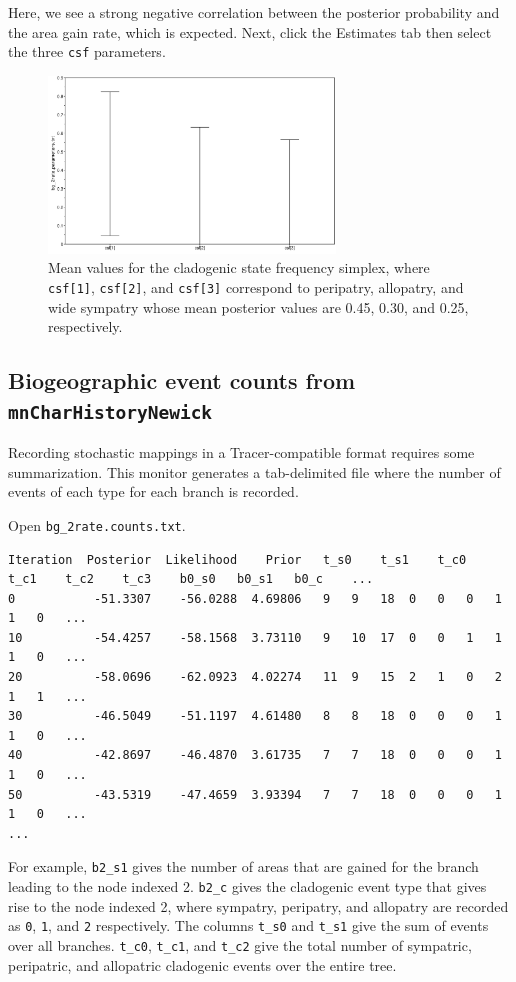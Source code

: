 \documentclass[11pt]{article}
\begin{document}
Here, we see a strong negative correlation between the posterior probability and the area gain rate, which is expected.
Next, click the Estimates tab then select the three {\tt csf} parameters.

\begin{figure}[H]
\centering
\includegraphics[width=3in]{figures/clado_freq_posterior}
\caption{Mean values for the cladogenic state frequency simplex, where {\tt csf[1]}, {\tt csf[2]}, and {\tt csf[3]} correspond to peripatry, allopatry, and wide sympatry whose mean posterior values are 0.45, 0.30, and 0.25, respectively.}
\end{figure}


\subsection{Biogeographic event counts from {\tt mnCharHistoryNewick}}

Recording stochastic mappings in a Tracer-compatible format requires some summarization.
This monitor generates a tab-delimited file where the number of events of each type for each branch is recorded.

Open {\tt bg\_2rate.counts.txt}.

\begin{framed}
\begin{lstlisting}[basicstyle=\tiny \listingsfont, columns=texcl]
Iteration  Posterior  Likelihood    Prior	t_s0	t_s1	t_c0	t_c1	t_c2	t_c3	b0_s0	b0_s1	b0_c	...
0           -51.3307    -56.0288  4.69806	9	9	18	0	0	0	1	1	0	...	
10          -54.4257    -58.1568  3.73110	9	10	17	0	0	1	1	1	0	...
20          -58.0696    -62.0923  4.02274	11	9	15	2	1	0	2	1	1	...
30          -46.5049    -51.1197  4.61480	8	8	18	0	0	0	1	1	0	...
40          -42.8697    -46.4870  3.61735	7	7	18	0	0	0	1	1	0	...
50          -43.5319    -47.4659  3.93394	7	7	18	0	0	0	1	1	0	...
...
\end{lstlisting}
\end{framed}

For example, {\tt b2\_s1} gives the number of areas that are gained for the branch leading to the node indexed 2.
{\tt b2\_c} gives the cladogenic event type that gives rise to the node indexed 2, where sympatry, peripatry, and allopatry are recorded as {\tt 0}, {\tt 1}, and {\tt 2} respectively. The columns {\tt t\_s0} and {\tt t\_s1} give the sum of events over all branches. {\tt t\_c0}, {\tt t\_c1}, and {\tt t\_c2} give the total number of sympatric, peripatric, and allopatric cladogenic events over the entire tree.
\end{document}
